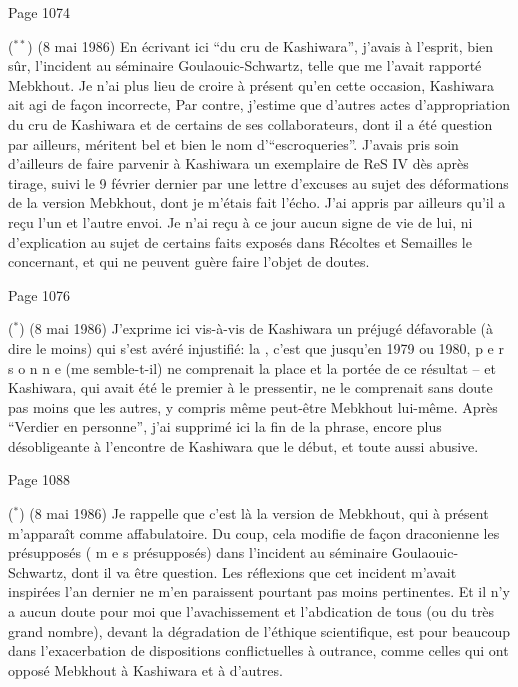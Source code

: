 
Page 1074

($^{**}$) (8 mai 1986) En écrivant ici ``du cru de Kashiwara'', j'avais à l'esprit, bien sûr, l'incident au séminaire Goulaouic-Schwartz, telle que me l'avait rapporté Mebkhout. Je n'ai plus lieu de croire à présent qu'en cette occasion, Kashiwara ait agi de façon incorrecte,  Par contre, j'estime que d'autres actes d'appropriation du cru de Kashiwara et de certains de ses collaborateurs, dont il a été question par ailleurs, méritent bel et bien le nom d'``escroqueries''. J'avais pris soin d'ailleurs de faire parvenir à Kashiwara  un exemplaire de ReS IV dès après tirage, suivi le 9 février dernier par une lettre d'excuses au sujet des déformations de la version Mebkhout, dont je m'étais fait l'écho. J'ai appris par ailleurs qu'il a reçu l'un et l'autre envoi. \handwritten{\unsure{,}} Je n'ai reçu à ce jour aucun signe de vie de lui, ni d'explication au sujet de certains faits exposés dans Récoltes et Semailles le concernant, et qui ne peuvent guère faire l'objet de doutes.

Page 1076

($^{*}$) (8 mai 1986) J'exprime ici vis-à-vis de Kashiwara un préjugé défavorable (à dire le moins) qui s'est avéré injustifié: la , c'est que jusqu'en 1979 ou 1980, p e r s o n n e (me semble-t-il)  ne comprenait la place et la portée de ce résultat -- et Kashiwara, qui avait été le premier à le pressentir, ne le comprenait sans doute pas moins que les autres, y compris même peut-être Mebkhout lui-même. Après ``Verdier en personne'', j'ai supprimé ici la fin de la phrase, encore plus désobligeante à l'encontre de Kashiwara que le début, et toute aussi abusive.

Page 1088

($^{*}$) (8 mai 1986) Je rappelle que c'est là la version de Mebkhout, qui à présent m'apparaît comme affabulatoire. Du coup, cela modifie de façon draconienne les présupposés ( m e s présupposés) dans l'incident au séminaire Goulaouic-Schwartz, dont il va être question. Les réflexions que cet incident m'avait inspirées l'an dernier ne m'en paraissent pourtant pas moins pertinentes. Et il n'y a aucun doute pour moi que l'avachissement et l'abdication de tous (ou du très grand nombre), devant la dégradation de l'éthique scientifique, est pour beaucoup dans l'exacerbation de dispositions conflictuelles à outrance, comme celles qui ont opposé Mebkhout à Kashiwara\deleted{\unsure{,}} et à d'autres.
